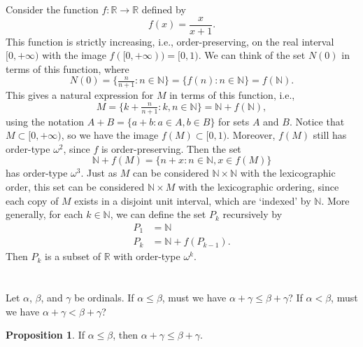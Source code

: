 \documentclass[12pt]{article}
\newenvironment{pbox}
    {\begin{lrbox}{\mybox}\begin{minipage}{0.98\textwidth}}
    {\end{minipage}\end{lrbox}\begin{center}\framebox[\textwidth]{\usebox{\mybox}}\end{center}}
\theoremstyle{definition}
\newtheorem{proposition}{Proposition}
\newcommand{\N}{\mathbb{N}}
\newcommand{\R}{\mathbb{R}}
\begin{document}
\begin{itemize}
    Consider the function $f : \R \to \R$ defined by
    \[
        f(x) = \frac{x}{x + 1}.
    \]
    This function is strictly increasing, i.e., order-preserving, on the real interval $[0, +\infty)$ with the image $f([0, +\infty)) = [0, 1)$. We can think of the set $N(0)$ in terms of this function, where
    \[
        N(0) = \{\tfrac{n}{n+1} : n \in \N\} = \{f(n) : n \in \N\} = f(\N).
    \]
    This gives a natural expression for $M$ in terms of this function, i.e.,
    \[
        M = \{k + \tfrac{n}{n+1} : k, n \in \N\} = \N + f(\N),
    \]
    using the notation $A + B = \{a + b : a \in A, b \in B\}$ for sets $A$ and $B$. Notice that $M \subset [0, +\infty)$, so we have the image $f(M) \subset [0, 1)$. Moreover, $f(M)$ still has order-type $\omega^2$, since $f$ is order-preserving. Then the set
    \[
        \N + f(M) = \{n + x : n \in \N, x \in f(M)\}
    \]
    has order-type $\omega^3$. Just as $M$ can be considered $\N \times \N$ with the lexicographic order, this set can be considered $\N \times M$ with the lexicographic ordering, since each copy of $M$ exists in a disjoint unit interval, which are `indexed' by $\N$. More generally, for each $k \in \N$, we can define the set $P_k$ recursively by
    \begin{align*}
        P_1 &= \N \\
        P_k &= \N + f(P_{k - 1}).
    \end{align*}
    Then $P_k$ is a subset of $\R$ with order-type $\omega^k$.
    
    
\end{itemize}

\newpage
\section{}
\begin{pbox}
    Let $\alpha$, $\beta$, and $\gamma$ be ordinals. If $\alpha \leq \beta$, must we have $\alpha + \gamma \leq \beta + \gamma$? If $\alpha < \beta$, must we have $\alpha + \gamma < \beta + \gamma$?
\end{pbox}

\begin{proposition}
    If $\alpha \leq \beta$, then $\alpha + \gamma \leq \beta + \gamma$.
\end{proposition}
\end{document}
